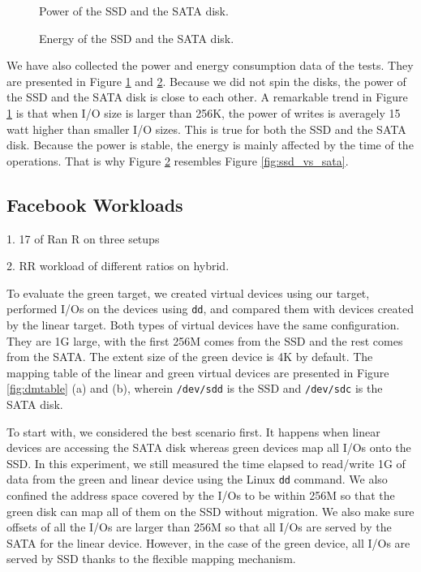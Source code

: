 \begin{figure}[t]
\begin{centering}
\caption{Power of the SSD and the SATA disk.}
\label{fig:power}
\end{centering}
\end{figure}

\begin{figure}[t]
\begin{centering}
\caption{Energy of the SSD and the SATA disk.}
\label{fig:energy}
\end{centering}
\end{figure}

We have also collected the power and energy consumption data of the
tests. They are presented in Figure \ref{fig:power} and
\ref{fig:energy}. Because we did not spin the disks, the power of the
SSD and the SATA disk is close to each other. A remarkable trend in 
Figure \ref{fig:power} is that when I/O size is larger than 256K, the
power of writes is averagely 15 watt higher than smaller I/O sizes.
This is true for both the SSD and the SATA disk. Because the power is
stable, the energy is mainly affected by the time of the operations.
That is why Figure \ref{fig:energy} resembles Figure
\ref{fig:ssd_vs_sata}. 

\subsection{Facebook Workloads}

1. 17 of Ran R on three setups

2. RR workload of different ratios on hybrid.

To evaluate the green target, we created virtual devices using our
target, performed I/Os on the devices using \texttt{dd}, and compared
them with devices created by the linear target.  Both types of virtual
devices have the same configuration. They are 1G large, with the first
256M comes from the SSD and the rest comes from the SATA. The extent
size of the green device is 4K by default. The mapping table of the
linear and green virtual devices are presented in Figure
\ref{fig:dmtable} (a) and (b), wherein \texttt{/dev/sdd} is the SSD
and \texttt{/dev/sdc} is the SATA disk. 

To start with, we considered the best scenario first. It happens when
linear devices are accessing the SATA disk whereas green devices map
all I/Os onto the SSD.  In this experiment, we still measured the time
elapsed to read/write 1G of data from the green and linear device
using the Linux \texttt{dd} command.  We also confined the address
space covered by the I/Os to be within 256M so that the green disk can
map all of them on the SSD without migration.  We also make sure
offsets of all the I/Os are larger than 256M so that all I/Os are
served by the SATA for the linear device. However, in the case of the
green device, all I/Os are served by SSD thanks to the flexible
mapping mechanism.  

